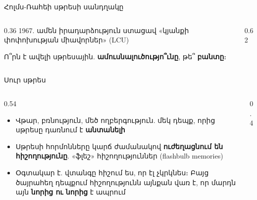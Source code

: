 \begin{frame}{Հոլմս-Ռահեի սթրեսի սանդղակը}
  \begin{columns}[c]
    \begin{column}{0.36\textwidth}
      {\small 1967. ամեն իրադարձություն ստացավ «կյանքի փոփոխության միավորներ» (LCU)}\par\medskip
      \begin{poll}
        Ո՞րն է ավելի սթրեսային. \textbf{ամուսնալուծությո՞ւնը}, թե՞ \textbf{բանտը}։
      \end{poll}
    \end{column}
    \begin{column}{0.62\textwidth}
      \centering
    \end{column}
  \end{columns}
\end{frame}

\begin{frame}{Սուր սթրես}
  \begin{columns}[c]
    \begin{column}{0.54\textwidth}
      \begin{itemize}
        \item Վթար, բռնություն, մեծ ողբերգություն. մեկ դեպք, որից սթրեսը դառնում է \textbf{անտանելի}
        \item<2-> Սթրեսի հորմոնները կարճ ժամանակով \textbf{ուժեղացնում են հիշողությունը}. «ֆլեշ» հիշողություններ (flashbulb memories)
        \item<3-> Օգտակար է. վտանգը հիշում ես, որ էլ չկրկնես։ Բայց ծայրահեղ դեպքում հիշողությունն այնքան վառ է, որ մարդն այն \textbf{նորից ու նորից} է ապրում
      \end{itemize}
    \end{column}
    \begin{column}{0.4\textwidth}
    \end{column}
  \end{columns}
\end{frame}

